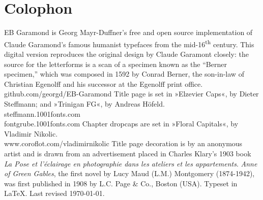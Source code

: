 \documentclass[
a5paper,
BCOR=7mm,
twoside,
DIV=calc,
11pt,
usegeometry,
chapterprefix,
headings=big]{scrbook} %
\begin{document}








































\clearpage
{}
\chapter*{Colophon}
\begin{center}
EB Garamond is Georg Mayr-Duffner's free and open source implementation of Claude Garamond’s famous humanist typefaces from the mid-16\textsuperscript{th} century. This digital version reproduces the original design by Claude Garamont closely: the source for the letterforms is a scan of a specimen known as the \enquote{Berner specimen,} which was composed in 1592 by Conrad Berner, the son-in-law of Christian Egenolff and his successor at the Egenolff print office.  \\github.com/georgd/EB-Garamond
\vfill
Title page is set in »Elzevier Caps«, by Dieter Steffmann; and »Trinigan FG«, by Andreas Höfeld.\\steffmann.1001fonts.com\\fontgrube.1001fonts.com
\vfill
Chapter dropcaps are set in »Floral Capitals«, by Vladimir Nikolic.\\www.coroflot.com/vladimirnikolic
\vfill
Title page decoration is by an anonymous artist and is drawn from an advertisement placed in Charles Klary's 1903 book \textit{La Pose et l’éclairage en photographie dans les ateliers et les appartements}.
\vfill
\textit{Anne of Green Gables}, the first novel by Lucy Maud (L.M.) Montgomery (1874-1942), was first published in 1908 by L.C. Page \& Co., Boston (USA).
\vfill
Typeset in \LaTeX{}. Last revised \today.
\end{center}
\thispagestyle{empty}
\end{document}
